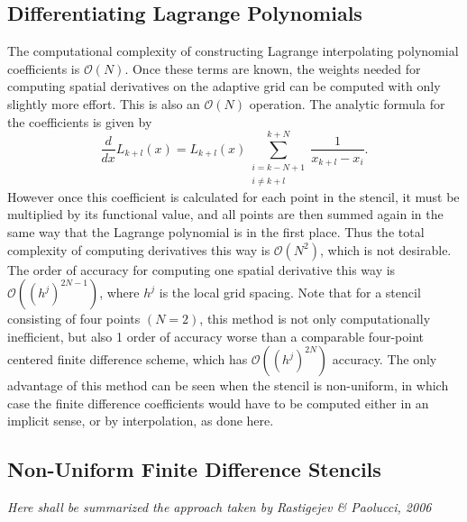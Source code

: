 \documentclass[11pt]{article}
\begin{document}
\subsection{Differentiating Lagrange Polynomials} 
The computational complexity of constructing Lagrange interpolating polynomial coefficients is $\mathcal{O}(N)$. 
Once these terms are known, the weights needed for computing spatial derivatives on the adaptive grid can be computed with only slightly more effort.
This is also an $\mathcal{O}(N)$ operation. The analytic formula for the coefficients is given by
\begin{equation}
    \frac{d}{dx} L_{k+l}(x) = L_{k+l}(x) \sum_{ \substack{ i=k-N+1 \\ i\neq k+l } }^{k+N} \frac{1}{x_{k+l}-x_i}.
\end{equation}
However once this coefficient is calculated for each point in the stencil, it must be multiplied by its functional value, 
and all points are then summed again in the same way that the Lagrange polynomial is in the first place. 
Thus the total complexity of computing derivatives this way is $\mathcal{O}(N^2)$, which is not desirable. The order of 
accuracy for computing one spatial derivative this way is $\mathcal{O}((h^j)^{2N-1})$, where $h^j$ is the local grid spacing. 
Note that for a stencil consisting of four points $(N=2)$, this method is not only computationally inefficient, but also 1 order 
of accuracy worse than a comparable four-point centered finite difference scheme, which has $\mathcal{O}((h^j)^{2N})$
accuracy. The only advantage of this method can be seen when the stencil is non-uniform, in which case the finite difference 
coefficients would have to be computed either in an implicit sense, or by interpolation, as done here.
\subsection{Non-Uniform Finite Difference Stencils}
\textit{Here shall be summarized the approach taken by Rastigejev \& Paolucci, 2006 }

\end{document}
